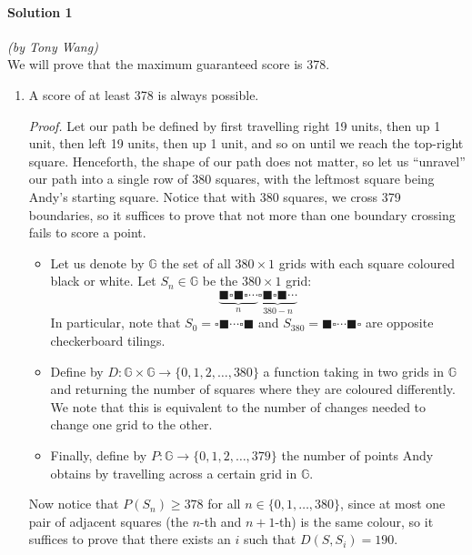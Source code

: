 \documentclass[10pt]{article}
\newcommand{\ws}{\square}
\newcommand{\bs}{\blacksquare}
\begin{document}
		\noindent \makebox[\linewidth]{\rule{\textwidth}{0.4pt}}	
	
	\paragraph{Solution 1} \textit{(by Tony Wang)}\\
	
	\noindent We will prove that the maximum guaranteed score is 378.
	
	\begin{enumerate}
	    \item A score of at least 378 is always possible.
	    
	    \emph{Proof.} Let our path be defined by first travelling right 19 units, then up 1 unit, then left 19 units, then up 1 unit, and so on until we reach the top-right square. Henceforth, the shape of our path does not matter, so let us ``unravel'' our path into a single row of 380 squares, with the leftmost square being Andy's starting square. Notice that with 380 squares, we cross 379 boundaries, so it suffices to prove that not more than one boundary crossing fails to score a point.
	    
	    \begin{itemize}
	        \item Let us denote by \(\mathbb{G}\) the set of all \(380 \times 1\) grids with each square coloured black or white. Let \(S_n \in \mathbb{G}\) be the \(380 \times 1\) grid: \[\underbrace{\bs\ws\bs\ws \cdots }_{n}\underbrace{\ws\bs\ws\bs \cdots}_{380-n} \] In particular, note that \(S_0 = \ws \bs \cdots \ws \bs\) and \(S_{380}=\bs \ws \cdots \bs \ws\) are opposite checkerboard tilings.
	        \item Define by \(D: \mathbb{G} \times \mathbb{G} \rightarrow \{0, 1, 2, \dots, 380\}\) a function taking in two grids in \(\mathbb{G}\) and returning the number of squares where they are coloured differently. We note that this is equivalent to the number of changes needed to change one grid to the other.
	        \item Finally, define by \(P: \mathbb{G} \rightarrow \{0, 1, 2, \dots, 379\}\) the number of points Andy obtains by travelling across a certain grid in \(\mathbb{G}\).
	    \end{itemize}
	    
	    Now notice that \(P(S_n) \geq 378\) for all \(n \in \{0, 1, \dots, 380\}\), since at most one pair of adjacent squares (the \(n\)-th and \(n+1\)-th) is the same colour, so it suffices to prove that there exists an \(i\) such that \(D(S, S_i) = 190\).
	    

\end{enumerate}
\end{document}
